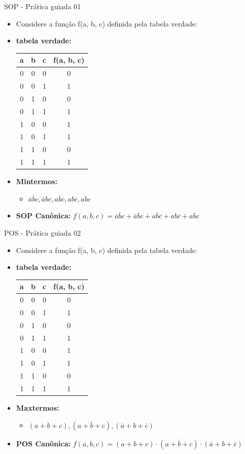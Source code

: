 \begin{frame}{SOP - Prática guiada 01}
	\begin{itemize}
		\item Considere a função f(a, b, c) definida pela tabela verdade:
		\item \textbf{tabela verdade:}
		\begin{tabular}{|c|c|c|c|}
			\hline
			a & b & c & f(a, b, c) \\
			\hline
			0 & 0 & 0 & 0 \\
			0 & 0 & 1 & 1 \\
			0 & 1 & 0 & 0 \\
			0 & 1 & 1 & 1 \\
			1 & 0 & 0 & 1 \\
			1 & 0 & 1 & 1 \\
			1 & 1 & 0 & 0 \\
			1 & 1 & 1 & 1 \\
			\hline
		\end{tabular}
		\item \textbf{Mintermos:}
		\begin{itemize}
			\item $\overline{a}\overline{b}c, \overline{a}bc, a\overline{b}\overline{c}, ab\overline{c}, abc$
		\end{itemize}
		\item \textbf{SOP Canônica:}
		$f(a,b,c) = \overline{a}\overline{b}c + \overline{a}bc + a\overline{b}\overline{c} + ab\overline{c} + abc$
	\end{itemize}
\end{frame}

\begin{frame}{POS - Prática guiada 02}
	\begin{itemize}
		\item Considere a função f(a, b, c) definida pela tabela verdade:
		\item \textbf{tabela verdade:}
		\begin{tabular}{|c|c|c|c|}
			\hline
			a & b & c & f(a, b, c) \\
			\hline
			0 & 0 & 0 & 0 \\
			0 & 0 & 1 & 1 \\
			0 & 1 & 0 & 0 \\
			0 & 1 & 1 & 1 \\
			1 & 0 & 0 & 1 \\
			1 & 0 & 1 & 1 \\
			1 & 1 & 0 & 0 \\
			1 & 1 & 1 & 1 \\
			\hline
		\end{tabular}
		\item \textbf{Maxtermos:}
		\begin{itemize}
			\item $(a + b + c), (a + \overline{b} + c), (\overline{a} + b + \overline{c})$
		\end{itemize}
		\item \textbf{POS Canônica:}
		$f(a,b,c) = (a + b + c) \cdot (a + \overline{b} + c) \cdot (\overline{a} + b + \overline{c})$
	\end{itemize}
\end{frame}

